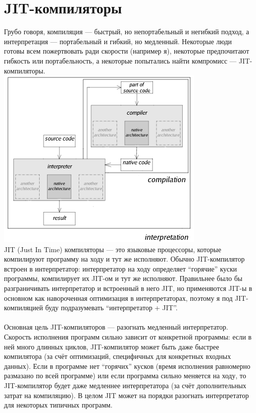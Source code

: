 \documentclass[11pt]{book}
\begin{document}
\section{JIT-компиляторы}
Грубо говоря, компиляция --- быстрый, но непортабельный и негибкий подход,
а интерпретация --- портабельный и гибкий, но медленный.
Некоторые люди готовы всем пожертвовать ради скорости (например я), некоторые предпочитают гибкость или портабельность,
а некоторые попытались найти компромисс --- JIT-компиляторы.
\\
\includegraphics[height=3.5in]{pic/jit.png}
\\
JIT (Just In Time) компиляторы --- это языковые процессоры, которые компилируют программу на ходу и тут же исполняют.
Обычно JIT-компилятор встроен в интерпретатор: интерпретатор на ходу определяет ``горячие'' куски программы, компилирует их JIT-ом и тут же исполняют.
Правильнее было бы разграничивать интерпретатор и встроенный в него JIT,
но применяются JIT-ы в основном как навороченная оптимизация в интерпретаторах,
поэтому я под JIT-компиляцией буду подразумевать ``интерпретатор + JIT''.
\\ \\
Основная цель JIT-компиляторов --- разогнать медленный интерпретатор.
Скорость исполнения программ сильно зависит от конкретной программы:
если в ней много длинных циклов, JIT-компилятор может быть даже быстрее компилятора
(за счёт оптимизаций, специфичных для конкретных входных данных).
Если в программе нет ``горячих'' кусков (время исполнения равномерно размазано по всей программе)
или если программа сильно меняется на ходу, то JIT-компилятор будет даже медленнее интерпретатора
(за счёт дополнительных затрат на компиляцию).
В целом JIT может на порядки разогнать интерпретатор для некоторых типичных программ.
\end{document}
